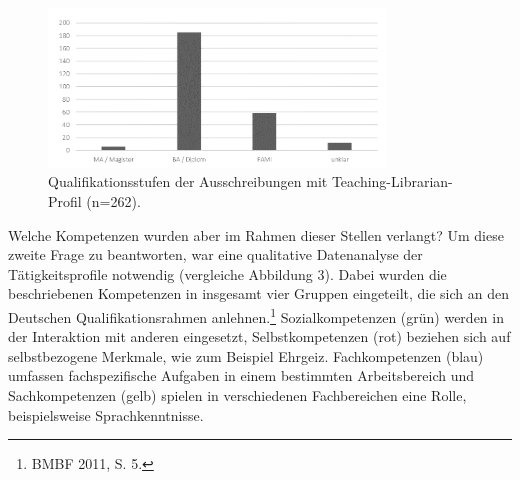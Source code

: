 \documentclass[a4paper,
fontsize=11pt,
oneside,
numbers=noperiodatend,
parskip=half-,
bibliography=totoc,
final
]{scrartcl}
\begin{document}
\begin{figure}
\centering
\includegraphics[width=0.8\textwidth]{img/image2.png}
\caption{Qualifikationsstufen der Ausschreibungen mit
Teaching-Librarian-Profil (n=262).}
\end{figure}

Welche Kompetenzen wurden aber im Rahmen dieser Stellen verlangt? Um
diese zweite Frage zu beantworten, war eine qualitative Datenanalyse der
Tätigkeitsprofile notwendig (vergleiche Abbildung 3). Dabei wurden die
beschriebenen Kompetenzen in insgesamt vier Gruppen eingeteilt, die sich
an den Deutschen Qualifikationsrahmen anlehnen.\footnote{BMBF 2011, S.
  5.} Sozialkompetenzen (grün) werden in der Interaktion mit anderen
eingesetzt, Selbstkompetenzen (rot) beziehen sich auf selbstbezogene
Merkmale, wie zum Beispiel Ehrgeiz. Fachkompetenzen (blau) umfassen
fachspezifische Aufgaben in einem bestimmten Arbeitsbereich und
Sachkompetenzen (gelb) spielen in verschiedenen Fachbereichen eine
Rolle, beispielsweise Sprachkenntnisse.
\end{document}
